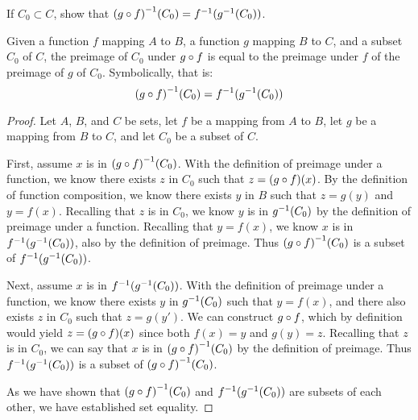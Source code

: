 \documentclass[main.tex]{subfiles}
\begin{document}
\subproblem{}\label{s2p4a}

If \(C_0 \subset C\), show that \({({g} \circ{} {f})}^{-1}(C_0) = {f}^{-1}({g}^{-1}(C_0))\).

\begin{thm}
	Given a function \(f\) mapping \(A\) to \(B\), a function \(g\) mapping
	\(B\) to \(C\), and a subset \(C_0\) of \(C\), the preimage of \(C_0\)
	under \({g} \circ{} {f}\) is equal to the preimage under \(f\) of the
	preimage of \(g\) of \(C_0\). Symbolically, that is:
	\[{({g} \circ{} {f})}^{-1}(C_0) = {f}^{-1}({g}^{-1}(C_0))\]
\end{thm}
\begin{proof}
	Let \(A\), \(B\), and \(C\) be sets, let \(f\) be a mapping from \(A\)
	to \(B\), let \(g\) be a mapping from \(B\) to \(C\), and let \(C_0\) be
	a subset of \(C\).

	First, assume \(x\) is in \({({g} \circ{} {f})}^{-1}(C_0)\). With the
	definition of preimage under a function, we know there exists \(z\) in
	\(C_0\) such that \(z = ({g} \circ{} {f})(x)\). By the definition of
	function composition, we know there exists \(y\) in \(B\) such that
	\(z = g(y)\) and \(y = f(x)\). Recalling that \(z\) is in \(C_0\), we
	know \(y\) is in \({g}^{-1}(C_0)\) by the definition of preimage
	under a function. Recalling that \(y = f(x)\), we know \(x\) is in
	\({f}^{-1}({g}^{-1}(C_0))\), also by the definition of preimage.
	Thus \({({g} \circ{} {f})}^{-1}(C_0)\) is a subset of
	\({f}^{-1}({g}^{-1}(C_0))\).

	Next, assume \(x\) is in \({f}^{-1}({g}^{-1}(C_0))\). With the
	definition of preimage under a function, we know there exists \(y\) in
	\({g}^{-1}(C_0)\) such that \(y = f(x)\), and there also exists
	\(z\) in \(C_0\) such that \(z = g(y')\). We can construct
	\({g} \circ{} {f}\), which by definition would yield
	\(z = ({g} \circ{} {f})(x)\) since both \(f(x) = y\) and \(g(y) = z\).
	Recalling that \(z\) is in \(C_0\), we can say that \(x\) is in
	\({({g} \circ{} {f})}^{-1}(C_0)\) by the definition of preimage. Thus
	\({f}^{-1}({g}^{-1}(C_0))\) is a subset of
	\({({g} \circ{} {f})}^{-1}(C_0)\).

	As we have shown that \({({g} \circ{} {f})}^{-1}(C_0)\) and
	\({f}^{-1}({g}^{-1}(C_0))\) are subsets of each other, we have
	established set equality.
\end{proof}
\end{document}
